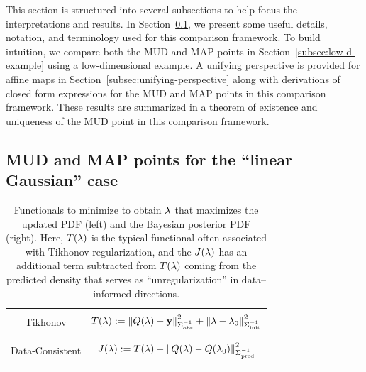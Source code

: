 This section is structured into several subsections to help focus the interpretations and results.
In Section~\ref{subsec:Motivation}, we present some useful details, notation, and terminology used for this comparison framework.
To build intuition, we compare both the MUD and MAP points in Section~\ref{subsec:low-d-example} using a low-dimensional example.
A unifying perspective is provided for affine maps in Section~\ref{subsec:unifying-perspective} along with derivations of closed form expressions for the MUD and MAP points in this comparison framework.
These results are summarized in a theorem of existence and uniqueness of the MUD point in this comparison framework.


\subsection{MUD and MAP points for the ``linear Gaussian'' case}\label{subsec:Motivation}



\begin{table}[htbp]
\centering
\begin{tabular}{|c|c|}
\hline
  & \\
  Tikhonov & $T(\lambda):=\left\Vert Q(\lambda)-\mathbf{y}\right\Vert_{\Sigma_\text{obs}^{-1}}^2 +
      \left\Vert\lambda-\lambda_0\right\Vert_{\Sigma_\text{init}^{-1}}^2$
  \\ & \\ \hline & \\
  Data-Consistent & $J(\lambda):=T(\lambda) - \left\Vert Q(\lambda)-Q(\lambda_0)\right\Vert_{\Sigma_\text{pred}^{-1}}^2$
  \\ & \\
  \hline
\end{tabular}
\caption{Functionals to minimize to obtain $\lambda$ that maximizes  the updated PDF (left) and the Bayesian posterior PDF (right).
Here, $T(\lambda)$ is the typical functional often associated with Tikhonov regularization, and the $J(\lambda)$ has an additional term subtracted from $T(\lambda)$ coming from the predicted density that serves as ``unregularization'' in data--informed directions.}
  \label{tab:func_comparisons}
\end{table}

